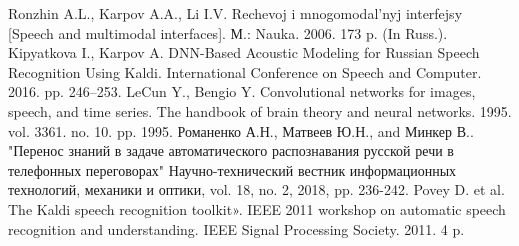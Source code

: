 \documentclass[conference]{IEEEtran}
\begin{document}
\begin{thebibliography}{00}
 Ronzhin A.L., Karpov A.A., Li I.V. Rechevoj i mnogomodal'nyj interfejsy [Speech and multimodal interfaces]. М.: Nauka. 2006. 173 p. (In Russ.).
 Kipyatkova I., Karpov A. DNN-Based Acoustic Modeling for Russian Speech Recognition Using Kaldi. International Conference on Speech and Computer. 2016. pp. 246–253.
 LeCun Y., Bengio Y. Convolutional networks for images, speech, and time series. The handbook of brain theory and neural networks. 1995. vol. 3361. no. 10. pp. 1995.
 Романенко А.Н., Матвеев Ю.Н., and Минкер В.. "Перенос знаний в задаче автоматического распознавания русской речи в телефонных переговорах" Научно-технический вестник информационных технологий, механики и оптики, vol. 18, no. 2, 2018, pp. 236-242.
 Povey D. et al. The Kaldi speech recognition toolkit». IEEE 2011 workshop on automatic speech recognition and understanding. IEEE Signal Processing Society. 2011. 4 p.
\end{thebibliography}
\vspace{12pt}
\end{document}
